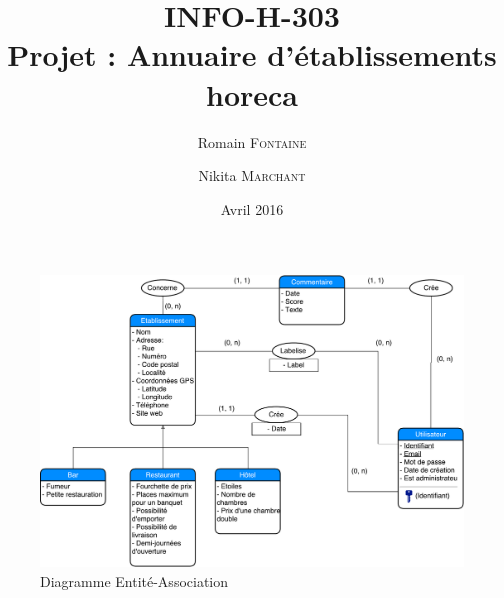 \documentclass[10pt,a4paper]{article}
\author{Romain \textsc{Fontaine} \and Nikita \textsc{Marchant}}
\date{Avril 2016}
\title{INFO-H-303 \\ Projet : Annuaire d’établissements horeca}
\begin{document}
\maketitle
\begin{figure}[p]
    \includegraphics[angle=90, scale=0.6]{EA.pdf}

    \caption{Diagramme Entité-Association}
\end{figure}
\end{document}
